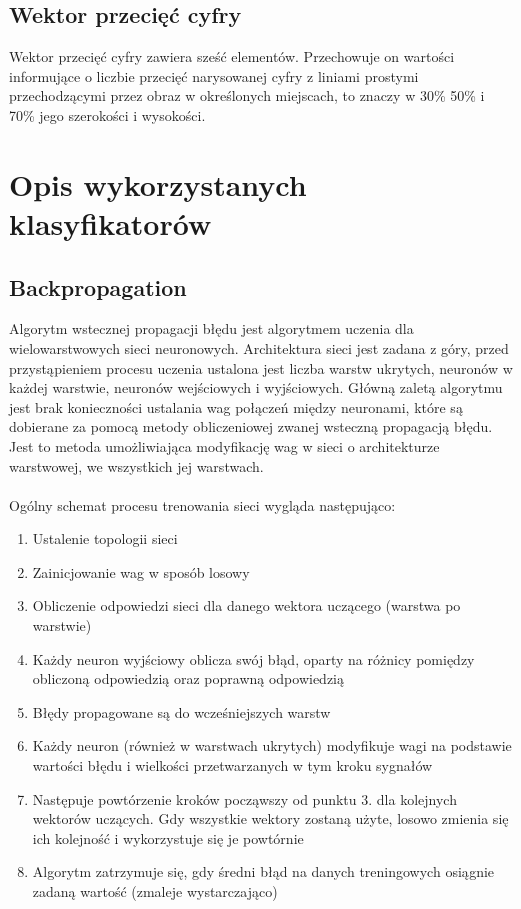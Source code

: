 \documentclass{article}
\begin{document}
\subsection{Wektor przecięć cyfry}
\label{DigitIntersectionVector}
Wektor przecięć cyfry zawiera sześć elementów. Przechowuje on wartości informujące o liczbie przecięć narysowanej cyfry z liniami prostymi przechodzącymi przez obraz w określonych miejscach, to znaczy w 30\% 50\% i 70\% jego szerokości i wysokości.

\section{Opis wykorzystanych klasyfikatorów}

\subsection{Backpropagation}
Algorytm wstecznej propagacji błędu jest algorytmem uczenia dla wielowarstwowych sieci neuronowych. Architektura sieci jest zadana z góry, przed przystąpieniem procesu uczenia ustalona jest liczba warstw ukrytych, neuronów w każdej warstwie, neuronów wejściowych i wyjściowych. Główną zaletą algorytmu jest brak konieczności ustalania wag połączeń między neuronami, które są dobierane za pomocą metody obliczeniowej zwanej wsteczną propagacją błędu. Jest to metoda umożliwiająca modyfikację wag w sieci o architekturze warstwowej, we wszystkich jej warstwach.\\\\
Ogólny schemat procesu trenowania sieci wygląda następująco:
\begin{enumerate}
\item Ustalenie topologii sieci
\item Zainicjowanie wag w sposób losowy
\item Obliczenie odpowiedzi sieci dla danego wektora uczącego (warstwa po warstwie)
\item Każdy neuron wyjściowy oblicza swój błąd, oparty na różnicy pomiędzy obliczoną odpowiedzią oraz poprawną odpowiedzią
\item Błędy propagowane są do wcześniejszych warstw
\item Każdy neuron (również w warstwach ukrytych) modyfikuje wagi na podstawie wartości błędu i wielkości przetwarzanych w tym kroku sygnałów
\item Następuje powtórzenie kroków począwszy od punktu 3. dla kolejnych wektorów uczących. Gdy wszystkie wektory zostaną użyte, losowo zmienia się ich kolejność i wykorzystuje się je powtórnie
\item Algorytm zatrzymuje się, gdy średni błąd na danych treningowych osiągnie zadaną wartość (zmaleje wystarczająco)
\end{enumerate}
\end{document}
